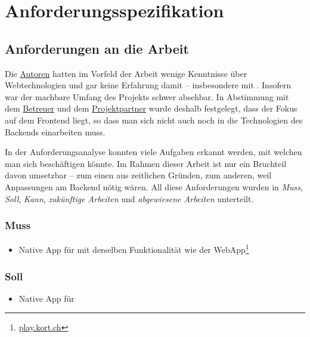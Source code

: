 \chapter{Anforderungsspezifikation}
\label{pd-anforderungsspezifikation}


\section{Anforderungen an die Arbeit} 
Die \hyperref[pm-rollen]{Autoren} hatten im Vorfeld der Arbeit wenige Kenntnisse über Webtechnologien und gar keine Erfahrung damit – insbesondere mit .
Insofern war der machbare Umfang des Projekts schwer absehbar.
In Abstimmung mit dem \hyperref[pm-rollen]{Betreuer} und dem \hyperref[pm-rollen]{Projektpartner} wurde deshalb festgelegt, dass der Fokus auf dem Frontend liegt, so dass man sich nicht auch noch in die Technologien des Backends einarbeiten muss.

In der Anforderungsanalyse konnten viele Aufgaben erkannt werden, mit welchen man sich beschäftigen könnte. Im Rahmen dieser Arbeit ist nur ein Bruchteil davon umsetzbar – zum einen aus zeitlichen Gründen, zum anderen, weil Anpassungen am Backend nötig wären.
All diese Anforderungen wurden in \emph{Muss}, \emph{Soll}, \emph{Kann}, \emph{zukünftige Arbeiten} und \emph{abgewiesene Arbeiten} unterteilt.

\subsection{Muss}
\begin{itemize}
	\item Native App für  mit derselben Funktionalität wie der \gls{WebApp}\footnote{\url{play.kort.ch}}
\end{itemize}

\subsection{Soll}
\begin{itemize}
	\item Native App für 
\end{itemize}

